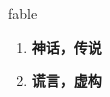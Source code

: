 
\begin{frame}
{\huge fable}
\begin{center}
\begin{enumerate}\Large
  \item \textbf{神话，传说}
  \item \textbf{谎言，虚构}
\end{enumerate}
\end{center}
\end{frame}
